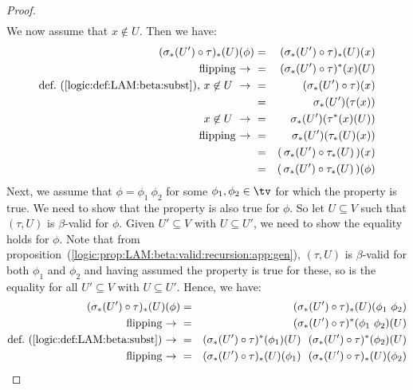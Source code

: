 \begin{proof}
\begin{eqnarray*}
        \end{eqnarray*}
    \noindent
    We now assume that $x\not\in U$. Then we have:
        \begin{eqnarray*}(\sigma_{*}(U')\circ\tau)_{*}(U)(\phi)
            &=&(\sigma_{*}(U')\circ\tau)_{*}(U)(x)\\
            \mbox{flipping\ $\to$\ }
            &=&(\sigma_{*}(U')\circ\tau)^{*}(x)(U)\\
            \mbox{def.~(\ref{logic:def:LAM:beta:subst}), $x\not\in U\ \to\ $}
            &=&(\sigma_{*}(U')\circ\tau)(x)\\
            &=&\sigma_{*}(U')(\tau(x))\\
            \mbox{$x\not\in U\ \to\ $}
            &=&\sigma_{*}(U')(\tau^{*}(x)(U))\\
            \mbox{flipping\ $\to$\ }
            &=&\sigma_{*}(U')(\tau_{*}(U)(x))\\
            &=&(\,\sigma_{*}(U')\circ\tau_{*}(U)\,)(x)\\
            &=&(\,\sigma_{*}(U')\circ\tau_{*}(U)\,)(\phi)
        \end{eqnarray*}
    Next, we assume that $\phi=\phi_{1}\ \phi_{2}$ for some $\phi_{1},\phi_{2}
    \in\tv$ for which the property is true. We need to show that the
    property is also true for $\phi$. So let $U\subseteq V$ such that 
    $(\tau, U)$ is $\beta$-valid for $\phi$. Given $U'\subseteq V$ with
    $U\subseteq U'$, we need to show the equality holds for $\phi$. Note that 
    from proposition~(\ref{logic:prop:LAM:beta:valid:recursion:app:gen}), 
    $(\tau,U)$ is $\beta$-valid for both $\phi_{1}$ and $\phi_{2}$ and 
    having assumed the property is true for these, so is the equality for
    all $U'\subseteq V$ with $U\subseteq U'$. Hence, we have:
        \begin{eqnarray*}(\sigma_{*}(U')\circ\tau)_{*}(U)(\phi)
            &=&(\sigma_{*}(U')\circ\tau)_{*}(U)(\phi_{1}\ \phi_{2})\\
            \mbox{flipping\ $\to$\ }
            &=&(\sigma_{*}(U')\circ\tau)^{*}(\phi_{1}\ \phi_{2})(U)\\
            \mbox{def.~(\ref{logic:def:LAM:beta:subst})\ $\to$\ }
            &=&(\sigma_{*}(U')\circ\tau)^{*}(\phi_{1})(U)\ \ 
               (\sigma_{*}(U')\circ\tau)^{*}(\phi_{2})(U)\\
            \mbox{flipping\ $\to$\ }
            &=&(\sigma_{*}(U')\circ\tau)_{*}(U)(\phi_{1})\ \ 
               (\sigma_{*}(U')\circ\tau)_{*}(U)(\phi_{2})\\

\end{eqnarray*}
\end{proof}
